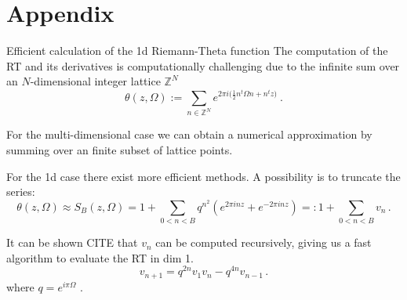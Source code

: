 \documentclass[10pt]{beamer}
\begin{document}
    
        


\section{Appendix}
\begin{frame}{Efficient calculation of the 1d Riemann-Theta function}
    The computation of the RT and its derivatives is computationally challenging due to the infinite sum over 
    an $N$-dimensional integer lattice $\mathbb{Z}^N$
    \begin{equation*}
        \theta ( z, \Omega) :=
        \sum_{n \in \mathbb{Z}^N} e^{2 \pi i \big( \frac{1}{2}n^t \Omega n + n^t z \big)} \ .
    \end{equation*}

    For the multi-dimensional case we can obtain a numerical approximation by summing over an finite subset of lattice points.

    For the 1d case there exist more efficient methods.
    A possibility is to truncate the series:
    \begin{equation*}
        \theta ( z, \Omega) \approx S_B(z, \Omega) = 1 + \sum_{0 < n < B}  q^{n^2} (e^{2 \pi i n z} + e^{- 2 \pi i n z}) =: 
        1 + \sum_{0 < n < B} v_n \, .
    \end{equation*}


    It can be shown CITE that $v_n$ can be computed recursively, giving us a fast algorithm to evaluate
    the RT in dim 1.
    \begin{equation}
            v_{n+1} = q^{ 2 n} v_1 v_n - q^{4 n} v_{n-1} \,. 
        \end{equation}
        where  $q = e^{i \pi \Omega}$ .
\end{frame}
\end{document}
